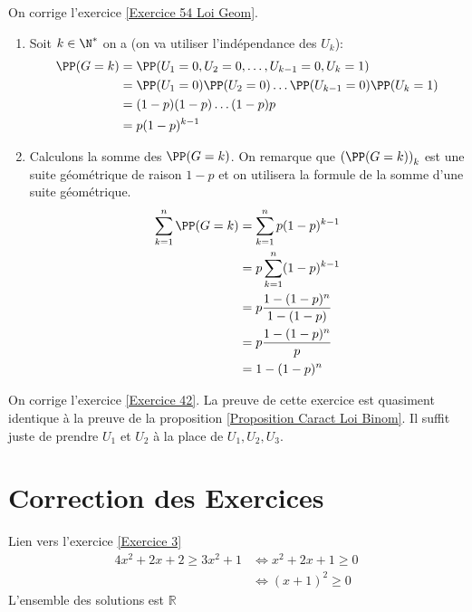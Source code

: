 \documentclass[12pt,fleqn]{report} %
\begin{document}
\begin{correction}
	On corrige l'exercice \ref{Exercice 54 Loi Geom}.\begin{enumerate}
		\item Soit $k\in \N^*$ on a (on va utiliser l'indépendance des $U_k$): \begin{align*}
		\PP(G = k) & = \PP(U_1 = 0,U_2 = 0,\dots, U_{k-1} = 0,U_k = 1) \\
		& = \PP(U_1 = 0)\PP(U_2 = 0)\dots \PP(U_{k-1} = 0)\PP(U_k = 1) \\
		& = (1-p)(1-p)\dots (1-p)p \\
		& = p (1 - p)^{k-1}
		\end{align*}
		\item Calculons la somme des $\PP(G = k)$. On remarque que $\left(\PP(G = k)\right)_k$ est une suite géométrique de raison $1-p$ et on utilisera la formule de la somme d'une suite géométrique.
		\begin{align*}
		\sum_{k = 1}^n \PP(G = k) & = \sum_{k = 1}^n p (1-p)^{k-1} \\
		& = p \sum_{k = 1}^n (1-p)^{k-1}\\
		& = p\frac{1 - (1-p)^n}{1 - (1 - p)} \\ 
		& = p \frac{1 - (1-p)^n}{p} \\ 
		& = 1 - (1-p)^n
		\end{align*}
	\end{enumerate}
\end{correction}

\begin{correction}
	On corrige l'exercice \ref{Exercice 42}. La preuve de cette exercice est quasiment identique à la preuve de la proposition \ref{Proposition Caract Loi Binom}. Il suffit juste de prendre $U_1$ et $U_2$ à la place de $U_1,U_2,U_3$.
\end{correction}

\chapter{Correction des Exercices}
\begin{correction}Lien vers l'exercice   \ref{Exercice 3}
	\begin{align*}
	4x^2 + 2x + 2 \ge 3x^2 +1 & \iff  x^2+2x+1 \ge 0\\
	& \iff (x+1)^2 \ge 0
	\end{align*}
	L'ensemble des solutions est $\mathbb{R}$
\end{correction}
\end{document}
